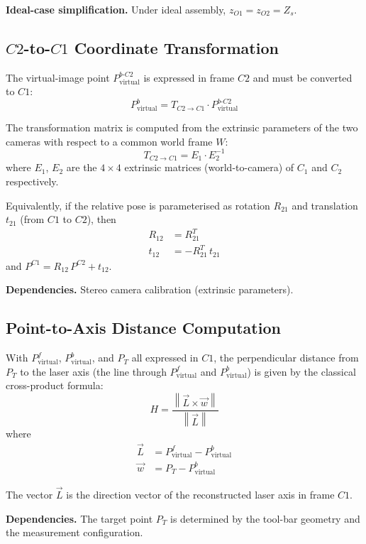\textbf{Ideal-case simplification.}
Under ideal assembly,
$z_{O1} = z_{O2} = Z_s$.



\subsection{$C2$-to-$C1$ Coordinate Transformation}
\label{sec:c2toc1}

The virtual-image point $P^{b\text{-}C2}_{\mathrm{virtual}}$
is expressed in frame $C2$ and must be converted to $C1$:
%
\begin{equation}
  \boxed{
    P^b_{\mathrm{virtual}}
      = T_{C2 \to C1}
        \cdot P^{b\text{-}C2}_{\mathrm{virtual}}
  }
  \label{eq:T-c2c1}
\end{equation}

The transformation matrix is computed from the extrinsic
parameters of the two cameras with respect to a common world
frame $W$:
%
\begin{equation}
  T_{C2 \to C1} = E_1 \cdot E_2^{-1}
  \label{eq:T-from-ext}
\end{equation}
%
where $E_1$, $E_2$ are the $4\times4$ extrinsic matrices
(world-to-camera) of $C_1$ and $C_2$ respectively.

Equivalently, if the relative pose is parameterised as
rotation $R_{21}$ and translation $t_{21}$
(from $C1$ to $C2$), then
%
\begin{align}
  R_{12} &= R_{21}^T  \label{eq:R12}\\
  t_{12} &= -R_{21}^T \, t_{21}  \label{eq:t12}
\end{align}
%
and $P^{C1} = R_{12}\, P^{C2} + t_{12}$.

\textbf{Dependencies.}
Stereo camera calibration (extrinsic parameters).


\subsection{Point-to-Axis Distance Computation}
\label{sec:distance}

With $P^f_{\mathrm{virtual}}$, $P^b_{\mathrm{virtual}}$,
and $P_T$ all expressed in $C1$,
the perpendicular distance from $P_T$ to the laser axis
(the line through
$P^f_{\mathrm{virtual}}$ and $P^b_{\mathrm{virtual}}$)
is given by the classical cross-product formula:
%
\begin{equation}
  \boxed{
    H = \frac{
      \left\| \vec{L} \times \vec{w} \right\|
    }{
      \left\| \vec{L} \right\|
    }
  }
  \label{eq:distance}
\end{equation}
%
where
%
\begin{align}
  \vec{L} &= P^f_{\mathrm{virtual}} - P^b_{\mathrm{virtual}}
  \label{eq:L-vec} \\
  \vec{w} &= P_T - P^b_{\mathrm{virtual}}
  \label{eq:w-vec}
\end{align}

The vector $\vec{L}$ is the direction vector of the
reconstructed laser axis in frame $C1$.

\textbf{Dependencies.}
The target point $P_T$ is determined by the tool-bar
geometry and the measurement configuration.
